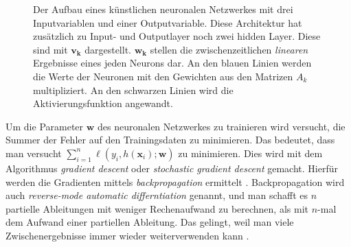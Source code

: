 \begin{figure}[ht]
  \label{fig:nn}
  \begin{center}
  \end{center}
  \caption[K\"unstliches Neuronales Netzwerk]
    {Der Aufbau eines k\"unstlichen neuronalen Netzwerkes mit drei Inputvariablen und einer Outputvariable. Diese Architektur hat zus\"atzlich zu Input- und Outputlayer 
    noch zwei hidden Layer. Diese sind mit $\mathbf{v_k}$ dargestellt. $\mathbf{w_k}$ stellen die zwischenzeitlichen \textit{linearen} Ergebnisse eines jeden Neurons dar. 
    An den blauen Linien werden die Werte der Neuronen mit den Gewichten aus den Matrizen $A_k$ multipliziert. An den schwarzen Linien wird die Aktivierungsfunktion angewandt.}
\end{figure}

Um die Parameter $\mathbf{w}$ des neuronalen Netzwerkes zu trainieren wird versucht, die Summer der Fehler auf den Trainingsdaten zu minimieren. Das bedeutet, dass 
man versucht $\sum_{i=1}^n \ell(y_i, h(\mathbf{x}_i); \mathbf{w})$ zu minimieren. Dies wird mit dem Algorithmus \textit{gradient descent} oder \textit{stochastic gradient descent}
gemacht. Hierf\"ur werden die Gradienten mittels \textit{backpropagation} ermittelt \cite{werbos}. Backpropagation wird auch \textit{reverse-mode automatic differntiation} genannt, und man 
schafft es $n$ partielle Ableitungen mit weniger Rechenaufwand zu berechnen, als mit $n$-mal dem Aufwand einer partiellen Ableitung. Das gelingt, weil man viele 
Zwischenergebnisse immer wieder weiterverwenden kann \cite[Kaptitel 7.3]{strang}.